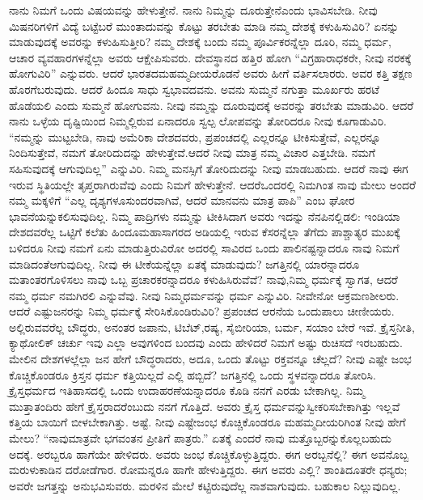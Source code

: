 \eject

ನಾನು ನಿಮಗೆ ಒಂದು ವಿಷಯವನ್ನು ಹೇಳುತ್ತೇನೆ. ನಾನು ನಿಮ್ಮನ್ನು ದೂರುತ್ತೇನೆ\break ಎಂದು ಭಾವಿಸಬೇಡಿ. ನೀವು ಮಿಷನರಿಗಳಿಗೆ ವಿದ್ಯೆ ಬಟ್ಟೆಬರೆ ಮುಂತಾದುವನ್ನು ಕೊಟ್ಟು ತರಬೇತು ಮಾಡಿ ನಮ್ಮ ದೇಶಕ್ಕೆ ಕಳುಹಿಸುವಿರಿ? ಏನನ್ನು ಮಾಡುವುದಕ್ಕೆ ಅವರನ್ನು ಕಳುಹಿಸುತ್ತೀರಿ? ನಮ್ಮ ದೇಶಕ್ಕೆ ಬಂದು ನಮ್ಮ ಪೂರ್ವಿಕರನ್ನೆಲ್ಲಾ ದೂರಿ, ನಮ್ಮ ಧರ್ಮ, ಆಚಾರ ವ್ಯವಹಾರಗಳನ್ನೆಲ್ಲಾ ಅವರು ಆಕ್ಷೇಪಿಸುವರು. ದೇವಸ್ಥಾನದ ಹತ್ತಿರ ಹೋಗಿ “ವಿಗ್ರಹಾರಾಧಕರೇ, ನೀವು ನರಕಕ್ಕೆ ಹೋಗುವಿರಿ” ಎನ್ನುವರು. ಆದರೆ ಭಾರತದ\break ಮಹಮ್ಮದೀಯರೊಡನೆ ಅವರು ಹೀಗೆ ವರ್ತಿಸಲಾರರು. ಅವರ ಕತ್ತಿ ತಕ್ಷಣ ಹೊರಗೆ\break ಬರುವುದು. ಆದರೆ ಹಿಂದೂ ಸಾಧು ಸ್ವಭಾವದವನು. ಅವನು ಸುಮ್ಮನೆ ನಗುತ್ತಾ ಮೂರ್ಖರು ಹರಟೆ ಹೊಡೆಯಲಿ ಎಂದು ಸುಮ್ಮನೆ ಹೋಗುವನು. ನೀವು ನಮ್ಮನ್ನು ದೂರುವುದಕ್ಕೆ ಅವರನ್ನು ತರಬೇತು ಮಾಡುವಿರಿ. ಆದರೆ ನಾನು ಒಳ್ಳೆಯ ದೃಷ್ಟಿಯಿಂದ ನಿಮ್ಮಲ್ಲಿರುವ ಏನಾದರೂ ಸ್ವಲ್ಪ ಲೋಪವನ್ನು ತೋರಿದರೂ ನೀವು ಕೂಗಾಡುವಿರಿ. “ನಮ್ಮನ್ನು ಮುಟ್ಟಬೇಡಿ, ನಾವು ಅಮೆರಿಕಾ ದೇಶದವರು, ಪ್ರಪಂಚದಲ್ಲಿ ಎಲ್ಲರನ್ನೂ ಟೀಕಿಸುತ್ತೇವೆ, ಎಲ್ಲರನ್ನೂ ನಿಂದಿಸುತ್ತೇವೆ, ನಮಗೆ ತೋರಿದುದನ್ನು ಹೇಳುತ್ತೇವೆ.\break ಆದರೆ ನೀವು ಮಾತ್ರ ನಮ್ಮ ವಿಚಾರ ಎತ್ತಬೇಡಿ. ನಮಗೆ ಸಹಿಸುವುದಕ್ಕೆ ಆಗುವುದಿಲ್ಲ” ಎನ್ನುವಿರಿ. ನಿಮ್ಮ ಮನಸ್ಸಿಗೆ ತೋರಿದುದನ್ನು ನೀವು ಮಾಡಬಹುದು. ಆದರೆ ನಾವು ಈಗ ಇರುವ ಸ್ಥಿತಿಯಲ್ಲೇ ತೃಪ್ತರಾಗಿರುವೆವು ಎಂದು ನಿಮಗೆ ಹೇಳುತ್ತೇನೆ. ಆದರೆ\break ಒಂದರಲ್ಲಿ ನಿಮಗಿಂತ ನಾವು ಮೇಲು ಅಂದರೆ ನಮ್ಮ ಮಕ್ಕಳಿಗೆ “ಎಲ್ಲ ದೃಶ್ಯಗಳೂ\break ಸುಂದರವಾಗಿವೆ, ಆದರೆ ಮಾನವನು ಮಾತ್ರ ಪಾಪಿ” ಎಂಬ ಘೋರ ಭಾವನೆಯನ್ನು\break ಕಲಿಸುವುದಿಲ್ಲ. ನಿಮ್ಮ ಪಾದ್ರಿಗಳು ನಮ್ಮನ್ನು ಟೀಕಿಸಿದಾಗ ಅವರು ಇದನ್ನು ನೆನಪಿನಲ್ಲಿಡಲಿ: ಇಂಡಿಯಾ ದೇಶದವರೆಲ್ಲ ಒಟ್ಟಿಗೆ ಕಲೆತು ಹಿಂದೂಮಹಾಸಾಗರದ ಅಡಿಯಲ್ಲಿ ಇರುವ ಕೆಸರನ್ನೆಲ್ಲಾ ತೆಗೆದು ಪಾಶ್ಚಾತ್ಯರ ಮುಖಕ್ಕೆ ಬಳಿದರೂ ನೀವು ನಮಗೆ ಏನು ಮಾಡುತ್ತಿರುವಿರೋ ಅದರಲ್ಲಿ ಸಾವಿರದ ಒಂದು ಪಾಲಿನಷ್ಟನ್ನಾದರೂ ನಾವು ನಿಮಗೆ ಮಾಡಿದಂತೆ\break ಆಗುವುದಿಲ್ಲ. ನೀವು ಈ ಟೀಕೆಯನ್ನೆಲ್ಲಾ ಏತಕ್ಕೆ ಮಾಡುವುದು? ಜಗತ್ತಿನಲ್ಲಿ ಯಾರನ್ನಾದರೂ\- ಮತಾಂತರಗೊಳಿಸಲು ನಾವು ಒಬ್ಬ ಪ್ರಚಾರಕರನ್ನಾದರೂ ಕಳುಹಿಸಿರುವೆವೆ? ನಾವು,\break ನಿಮ್ಮ ಧರ್ಮಕ್ಕೆ ಸ್ವಾಗತ, ಆದರೆ ನಮ್ಮ ಧರ್ಮ ನಮಗಿರಲಿ ಎನ್ನುವೆವು. ನೀವು ನಿಮ್ಮ\break ಧರ್ಮವನ್ನು ಧರ್ಮ ಎನ್ನುವಿರಿ. ನೀವೇನೋ ಆಕ್ರಮಣಶೀಲರು. ಆದರೆ ಎಷ್ಟು\break ಜನರನ್ನು ನಿಮ್ಮ ಧರ್ಮಕ್ಕೆ ಸೇರಿಸಿಕೊಂಡಿರುವಿರಿ? ಪ್ರಪಂಚದ ಆರನೆಯ ಒಂದು\break ಪಾಲು ಚೀಣೀಯರು. ಅಲ್ಲಿರುವವರೆಲ್ಲ ಬೌದ್ಧರು, ಅನಂತರ ಜಪಾನು, ಟಿಬೆಟ್​,\break ರಷ್ಯ, ಸೈಬೀರಿಯಾ, ಬರ್ಮ, ಸಯಾಂ ಬೇರೆ ಇವೆ. ಕ್ರೈಸ್ತನೀತಿ, ಕ್ಯಾಥೋಲಿಕ್​ ಚರ್ಚು ಇವು ಎಲ್ಲಾ ಅವುಗಳಿಂದ ಬಂದವು ಎಂದು ಹೇಳಿದರೆ ನಿಮಗೆ ಅಷ್ಟು ರುಚಿಸದೆ ಇರಬಹುದು. ಮೇಲಿನ ದೇಶಗಳಲ್ಲೆಲ್ಲಾ ಜನ ಹೇಗೆ ಬೌದ್ಧರಾದರು, ಅದೂ, ಒಂದು ತೊಟ್ಟು ರಕ್ತವನ್ನೂ ಚೆಲ್ಲದೆ? ನೀವು ಎಷ್ಟೇ ಜಂಭ ಕೊಚ್ಚಿಕೊಂಡರೂ ಕ್ರಿಸ್ತನ ಧರ್ಮ ಕತ್ತಿಯಿಲ್ಲದೆ ಎಲ್ಲಿ ಹಬ್ಬಿದೆ? ಜಗತ್ತಿನಲ್ಲಿ ಒಂದು ಸ್ಥಳವನ್ನಾದರೂ ತೋರಿಸಿ. ಕ್ರೈಸ್ತಧರ್ಮದ ಇತಿಹಾಸದಲ್ಲಿ ಒಂದು ಉದಾಹರಣೆಯನ್ನಾದರೂ ಕೊಡಿ ನನಗೆ ಎರಡು ಬೇಕಾಗಿಲ್ಲ. ನಿಮ್ಮ ಮುತ್ತಾತಂದಿರು ಹೇಗೆ ಕ್ರೈಸ್ತರಾದರೆಂಬುದು ನನಗೆ ಗೊತ್ತಿದೆ. ಅವರು ಕ್ರೈಸ್ತ ಧರ್ಮವನ್ನು\break ಸ್ವೀಕರಿಸಬೇಕಾಗಿತ್ತು ಇಲ್ಲವೆ ಕತ್ತಿಯ ಬಾಯಿಗೆ ಬೀಳಬೇಕಾಗಿತ್ತು. ಅಷ್ಟೆ. ನೀವು ಎಷ್ಟೇ\break ಜಂಭ ಕೊಚ್ಚಿಕೊಂಡರೂ ಮಹಮ್ಮದೀಯರಿಗಿಂತ ನೀವು ಹೇಗೆ ಮೇಲು? “ನಾವು\break ಮಾತ್ರವೇ ಭಗವಂತನ ಪ್ರೀತಿಗೆ ಪಾತ್ರರು.” ಏತಕ್ಕೆ ಎಂದರೆ ನಾವು ಮತ್ತೊಬ್ಬರನ್ನು\break ಕೊಲ್ಲಬಹುದು ಅದಕ್ಕೆ. ಅರಬ್ಬರೂ ಹಾಗೆಯೇ ಹೇಳಿದರು. ಅವರು ಜಂಭ ಕೊಚ್ಚಿ\break ಕೊಳ್ಳುತ್ತಿದ್ದರು. ಈಗ ಅರಬ್ಬನೆಲ್ಲಿ? ಈಗ ಅವನೊಬ್ಬ ಮರುಳುಕಾಡಿನ ದರೋಡೆಗಾರ. ರೋಮನ್ನರೂ ಹಾಗೇ ಹೇಳುತ್ತಿದ್ದರು. ಈಗ ಅವರು ಎಲ್ಲಿ? ಶಾಂತಿದೂತರೇ ಧನ್ಯರು; ಅವರೇ ಜಗತ್ತನ್ನು ಅನುಭವಿಸುವರು. ಮರಳಿನ ಮೇಲೆ ಕಟ್ಟಿರುವುದೆಲ್ಲ ನಾಶವಾಗುವುದು. ಬಹುಕಾಲ ನಿಲ್ಲುವುದಿಲ್ಲ.


